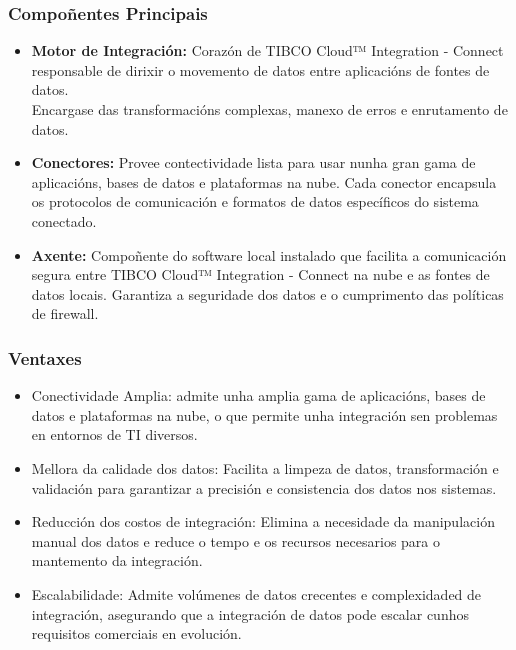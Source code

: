 \begin{flushleft}
\subsubsection{Compoñentes Principais}
\begin{itemize}
    \item \textbf{Motor de Integración:} Corazón de TIBCO Cloud™ Integration - Connect responsable de dirixir o movemento de datos entre aplicacións de fontes de datos.\\
    Encargase das transformacións complexas, manexo de erros e enrutamento de datos.
    \item \textbf{Conectores:} Provee contectividade lista para usar nunha gran gama de aplicacións, bases de datos e plataformas na nube. Cada conector encapsula os protocolos de comunicación e formatos de datos específicos do sistema conectado.
    \item \textbf{Axente: }Compoñente do software local instalado que facilita a comunicación segura entre TIBCO Cloud™ Integration - Connect na nube e as fontes de datos locais. Garantiza a seguridade dos datos e o cumprimento das políticas de firewall.
\end{itemize}
\subsubsection{Ventaxes }
\begin{itemize}
    \item Conectividade Amplia: admite unha amplia gama de aplicacións, bases de datos e plataformas na nube, o que permite unha integración sen problemas en entornos de TI diversos.
    \item Mellora da calidade dos datos: Facilita a limpeza de datos, transformación e validación para garantizar a precisión e consistencia dos datos nos sistemas.
    \item Reducción dos costos de integración: Elimina a necesidade da manipulación manual dos datos e reduce o tempo e os recursos necesarios para o mantemento da integración.
    \item Escalabilidade: Admite volúmenes de datos crecentes e complexidaded de integración, asegurando que a integración de datos pode escalar cunhos requisitos comerciais en evolución.
\end{itemize}
\end{flushleft}

